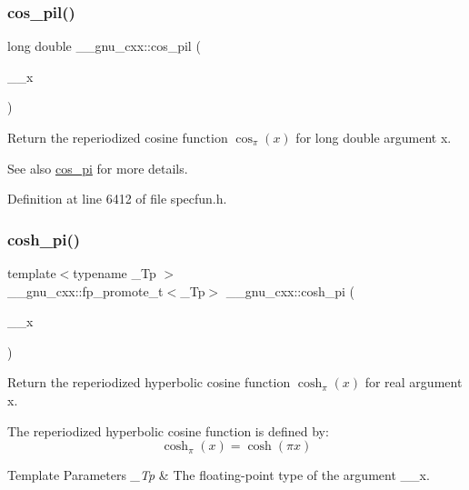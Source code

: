 \subsubsection{\texorpdfstring{cos\+\_\+pil()}{cos\_pil()}}
{\footnotesize\ttfamily long double \+\_\+\+\_\+gnu\+\_\+cxx\+::cos\+\_\+pil (\begin{DoxyParamCaption}\item[{long double}]{\+\_\+\+\_\+x }\end{DoxyParamCaption})\hspace{0.3cm}{\ttfamily [inline]}}

Return the reperiodized cosine function $ \cos_\pi(x) $ for {\ttfamily long double} argument {\ttfamily x}.

\begin{DoxySeeAlso}{See also}
\hyperlink{group__mathsf__gnu_gafc4698ae591b0e9e61285b0794d43ef4}{cos\+\_\+pi} for more details. 
\end{DoxySeeAlso}


Definition at line 6412 of file specfun.\+h.

\mbox{\label{group__mathsf__gnu_gaf59c68a01adfdab0f22c4fb405ab2a36}} 
\subsubsection{\texorpdfstring{cosh\+\_\+pi()}{cosh\_pi()}}
{\footnotesize\ttfamily template$<$typename \+\_\+\+Tp $>$ \\
\+\_\+\+\_\+gnu\+\_\+cxx\+::fp\+\_\+promote\+\_\+t$<$\+\_\+\+Tp$>$ \+\_\+\+\_\+gnu\+\_\+cxx\+::cosh\+\_\+pi (\begin{DoxyParamCaption}\item[{\+\_\+\+Tp}]{\+\_\+\+\_\+x }\end{DoxyParamCaption})\hspace{0.3cm}{\ttfamily [inline]}}

Return the reperiodized hyperbolic cosine function $ \cosh_\pi(x) $ for real argument {\ttfamily x}.

The reperiodized hyperbolic cosine function is defined by\+: \[ \cosh_\pi(x) = \cosh(\pi x) \]


\begin{DoxyTemplParams}{Template Parameters}
{\em \+\_\+\+Tp} & The floating-\/point type of the argument {\ttfamily \+\_\+\+\_\+x}. \\
\hline
\end{DoxyTemplParams}

